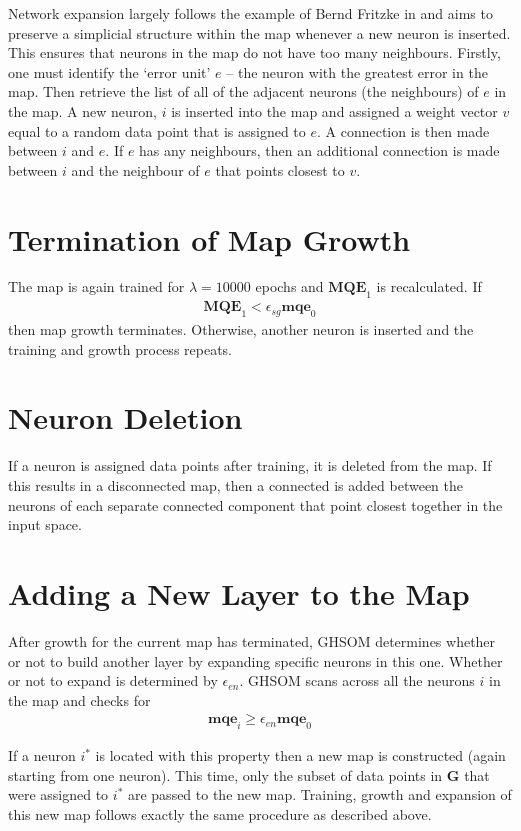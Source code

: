 \documentclass{report}
\begin{document}
	Network expansion largely follows the example of Bernd Fritzke in \cite{fritzke1994growing} and aims to preserve a simplicial structure within the map whenever a new neuron is inserted. 
	This ensures that neurons in the map do not have too many neighbours. 
	Firstly, one must identify the `error unit' $e$ -- the neuron with the greatest error in the map. 
	Then retrieve the list of all of the adjacent neurons (the neighbours) of $e$ in the map.
	A new neuron, $i$ is inserted into the map and assigned a weight vector $v$ equal to a random data point that is assigned to $e$.
	A connection is then made between $i$ and $e$.
	If $e$ has any neighbours, then an additional connection is made between $i$ and the neighbour of $e$ that points closest to $v$.   
	
	\section{Termination of Map Growth}
	The map is again trained for $\lambda=10000$ epochs and $\textbf{MQE}_1$ is recalculated. If
	\begin{align}
	\textbf{MQE}_1 < \epsilon_{sg} \textbf{mqe}_0
	\end{align}
	then map growth terminates. 
	Otherwise, another neuron is inserted and the training and growth process repeats.
	
	\section{Neuron Deletion}
	If a neuron is assigned data points after training, it is deleted from the map. If this results in a disconnected map, then a connected is added between the neurons of each separate connected component that point closest together in the input space. 
	
	\section{Adding a New Layer to the Map}
	After growth for the current map has terminated, GHSOM determines whether or not to build another layer by expanding specific neurons in this one. 
	Whether or not to expand is determined by $\epsilon_{en}$. 
	GHSOM scans across all the neurons $i$ in the map and checks for
	\begin{align}
	\textbf{mqe}_i \geq \epsilon_{en} \textbf{mqe}_0
	\end{align}
	
	If a neuron $i^*$ is located with this property then a new map is constructed (again starting from one neuron). 
	This time, only the subset of data points in $\textbf{G}$ that were assigned to $i^*$ are passed to the new map. 
	Training, growth and expansion of this new map follows exactly the same procedure as described above.
	
\end{document}
